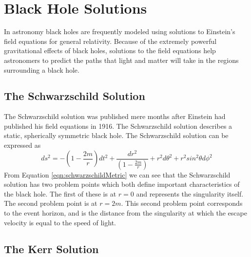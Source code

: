 \documentclass[12pt, oneside]{smuthesis}
\begin{document}
\section{\sc Black Hole Solutions} \label{blackHoleSolutions}

In astronomy black holes are frequently modeled using solutions to Einstein's field equations for general relativity. Because of the extremely powerful gravitational effects of black holes, solutions to the field equations help astronomers to predict the paths that light and matter will take in the regions surrounding a black hole.

\subsection{\sc The Schwarzschild Solution} \label{schwarzschildSolution}

The Schwarzschild solution was published mere months after Einstein had published his field equations in 1916. The Schwarzschild solution describes a static, spherically symmetric black hole. The Schwarzschild solution can be expressed as
\begin{equation}\label{eqn:schwarzschildMetric}
ds^{2}=-\left(1-\frac{2m}{r}\right)dt^{2}+\frac{dr^{2}}{\left(1-\frac{2m}{r}\right)}+r^{2}d\theta^{2}+r^{2}sin^{2}\theta d\phi^{2}
\end{equation}
From Equation \ref{eqn:schwarzschildMetric} we can see that the Schwarzschild solution has two problem points which both define important characteristics of the black hole. The first of these is at $r=0$ and represents the singularity itself. The second problem point is at $r=2m$. This second problem point corresponds to the event horizon, and is the distance from the singularity at which the escape velocity is equal to the speed of light.

\subsection{\sc The Kerr Solution} \label{kerrSolution}
\end{document}
